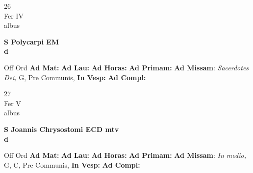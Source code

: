 \documentclass[10pt, openany]{book}
\begin{document}
    \begin{center}
        \begin{minipage}{3.5in}
            \vspace{2em}
            \begin{minipage}{0.5in}
                {\Huge 26} \\
                {\normalsize Fer IV} \\
                {\normalsize albus}
            \end{minipage}
            \begin{minipage}{3.0in}
                \textbf{ \large S Polycarpi EM \\
                \textnormal{\normalsize d}} \\ 
            \end{minipage}
            \begin{justify}Off Ord
                \textbf{Ad Mat: }
                \textbf{Ad Lau: }
                \textbf{Ad Horas: }
                \textbf{Ad Primam: }\textbf{Ad Missam}: \textit{Sacerdotes Dei,} G, Pre Communis,  
                \textbf{In Vesp: }
                \textbf{Ad Compl: }
            \end{justify}
        \end{minipage}
    \end{center}

    \begin{center}
        \begin{minipage}{3.5in}
            \vspace{2em}
            \begin{minipage}{0.5in}
                {\Huge 27} \\
                {\normalsize Fer V} \\
                {\normalsize albus}
            \end{minipage}
            \begin{minipage}{3.0in}
                \textbf{ \large S Joannis Chrysostomi ECD mtv \\
                \textnormal{\normalsize d}} \\ 
            \end{minipage}
            \begin{justify}Off Ord
                \textbf{Ad Mat: }
                \textbf{Ad Lau: }
                \textbf{Ad Horas: }
                \textbf{Ad Primam: }\textbf{Ad Missam}: \textit{In medio,} G, C, Pre Communis,  
                \textbf{In Vesp: }
                \textbf{Ad Compl: }
            \end{justify}
        \end{minipage}
    \end{center}
\end{document}
